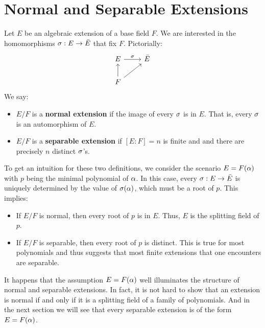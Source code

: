\section{Normal and Separable Extensions}

Let $E$ be an algebraic extension of a base field $F$. We are interested in the homomorphisms $\sigma: E \to \bar{E}$ that fix $F$. Pictorially:
\[
    \begin{tikzcd}
        E \arrow[r, "\sigma"]  & \bar{E} \\
        F \arrow[u] \arrow[ru] &        
    \end{tikzcd}
\]
We say:
\begin{itemize}
    \item $E/F$ is a \textbf{normal extension} if the image of every $\sigma$ is in $E$. That is, every $\sigma$ is an automorphism of $E$.
    \item $E/F$ is a \textbf{separable extension} if $[E : F] = n$ is finite and and there are precisely $n$ distinct $\sigma$'s.
\end{itemize}

To get an intuition for these two definitions, we consider the scenario $E = F(\alpha)$ with $p$ being the minimal polynomial of $\alpha$. In this case, every $\sigma: E \to \bar{E}$ is uniquely determined by the value of $\sigma(\alpha)$, which must be a root of $p$. This implies:
\begin{itemize}
    \item If $E/F$ is normal, then every root of $p$ is in $E$. Thus, $E$ is the splitting field of $p$.
    \item If $E/F$ is separable, then every root of $p$ is distinct. This is true for most polynomials and thus suggests that most finite extensions that one encounters are separable.
\end{itemize}

It happens that the assumption $E = F(\alpha)$ well illuminates the structure of normal and separable extensions. In fact, it is not hard to show that an extension is normal if and only if it is a splitting field of a family of polynomials. And in the next section we will see that every separable extension is of the form $E = F(\alpha)$.
